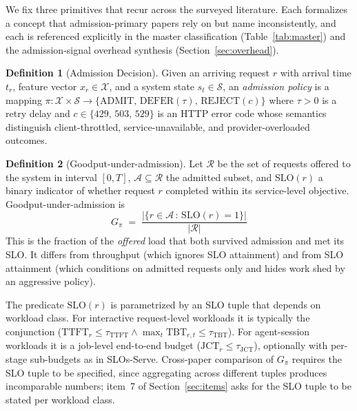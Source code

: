 \documentclass[11pt,letterpaper]{article}
\theoremstyle{definition}
\newtheorem{definition}{Definition}
\begin{document}
We fix three primitives that recur across the surveyed literature.
Each formalizes a concept that admission-primary papers rely on but
name inconsistently, and each is referenced explicitly in the master
classification (Table~\ref{tab:master}) and the admission-signal
overhead synthesis (Section~\ref{sec:overhead}).

\begin{definition}[Admission Decision]
\label{def:admission}
Given an arriving request $r$ with arrival time $t_r$, feature vector
$x_r \in \mathcal{X}$, and a system state
$s_t \in \mathcal{S}$, an \emph{admission policy} is a mapping
$\pi : \mathcal{X} \times \mathcal{S} \to \{\mathrm{ADMIT},\,
\mathrm{DEFER}(\tau),\, \mathrm{REJECT}(c)\}$ where $\tau > 0$ is a
retry delay and $c \in \{429,\,503,\,529\}$ is an HTTP error code
whose semantics distinguish client-throttled, service-unavailable, and
provider-overloaded outcomes.
\end{definition}

\begin{definition}[Goodput-under-admission]
\label{def:goodput}
Let $\mathcal{R}$ be the set of requests offered to the system in
interval $[0, T]$, $\mathcal{A} \subseteq \mathcal{R}$ the admitted
subset, and $\mathrm{SLO}(r)$ a binary indicator of whether request $r$
completed within its service-level objective. Goodput-under-admission
is
%
\begin{equation}
G_\pi \;=\; \frac{|\{r \in \mathcal{A}\,:\,\mathrm{SLO}(r) = 1\}|}{|\mathcal{R}|}
\label{eq:goodput}
\end{equation}
%
This is the fraction of the \emph{offered} load that both survived
admission and met its SLO. It differs from throughput (which ignores
SLO attainment) and from SLO attainment (which conditions on admitted
requests only and hides work shed by an aggressive policy).

The predicate $\mathrm{SLO}(r)$ is parametrized by an SLO tuple that
depends on workload class. For interactive request-level workloads it
is typically the conjunction ($\mathrm{TTFT}_r \le \tau_{\text{TTFT}}
\wedge \max_t \mathrm{TBT}_{r,t} \le \tau_{\text{TBT}}$). For
agent-session workloads it is a job-level end-to-end budget
($\mathrm{JCT}_r \le \tau_{\text{JCT}}$), optionally with per-stage
sub-budgets as in SLOs-Serve. Cross-paper comparison of
$G_\pi$ requires the SLO tuple to be specified, since aggregating
across different tuples produces incomparable numbers; item~7 of
Section~\ref{sec:items} asks for the SLO tuple to be stated per
workload class.
\end{definition}
\end{document}

